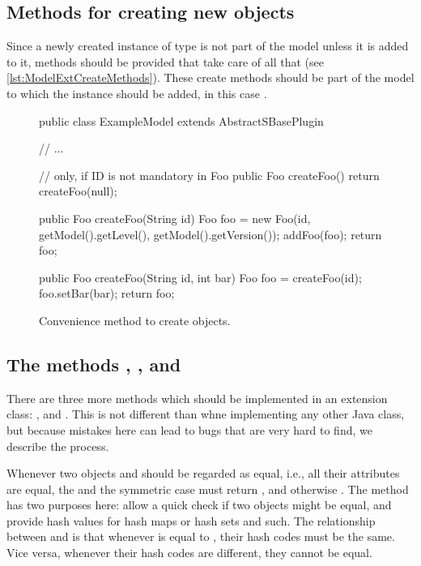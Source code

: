 \subsection{Methods for creating new objects}

Since a newly created instance of type  is not part of the model
unless it is added to it,  methods should be provided that
take care of all that (see \vref{lst:ModelExtCreateMethods}).
These create methods should be part of the model to which the 
instance should be added, in this case .

\begin{figure}[thb]
  \begin{example}[numbers=left]
public class ExampleModel extends AbstractSBasePlugin {

  // ...

  // only, if ID is not mandatory in Foo
  public Foo createFoo() {
    return createFoo(null);
  }

  public Foo createFoo(String id) {
    Foo foo = new Foo(id, getModel().getLevel(), getModel().getVersion());
    addFoo(foo);
    return foo;
  }

  public Foo createFoo(String id, int bar) {
    Foo foo = createFoo(id);
    foo.setBar(bar);
    return foo;
  }
}\end{example}
  \caption{Convenience method to create  objects.}
  \label{lst:ModelExtCreateMethods}
\end{figure}


\subsection{The methods , , and }

There are three more methods which should be implemented in an extension
class: ,  and .  This is not
different than whne implementing any other Java class, but because mistakes
here can lead to bugs that are very hard to find, we describe the process.

Whenever two objects  and  should be regarded as equal,
i.e., all their attributes are equal, the  and the
symmetric case  must return , and otherwise
. The  method has two purposes here: allow a
quick check if two objects might be equal, and provide hash values for hash
maps or hash sets and such. The relationship between  and
 is that whenever  is equal to , their
hash codes must be the same. Vice versa, whenever their hash codes are
different, they cannot be equal.

